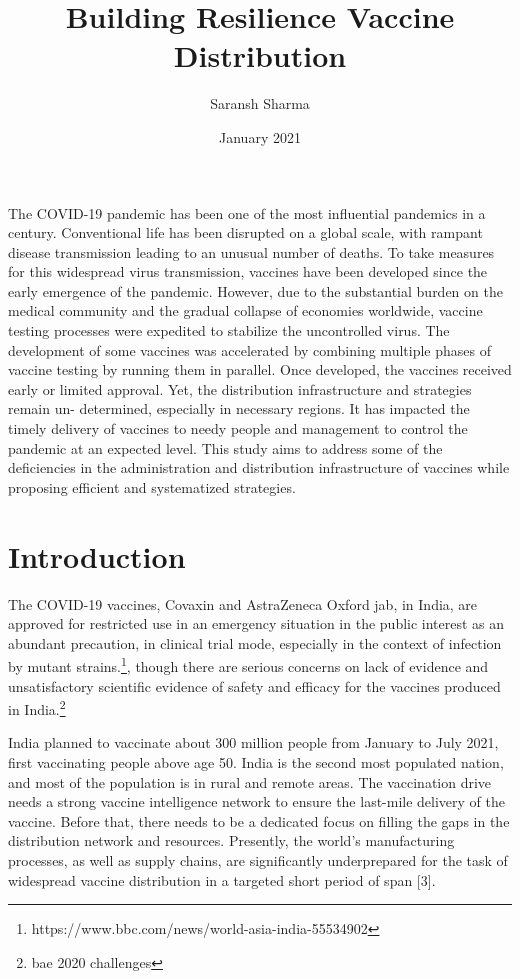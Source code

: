 \documentclass{article}
\begin{document}
\title{Building Resilience Vaccine Distribution}
\author{Saransh Sharma }
\date{January 2021}


\maketitle


\abstract

The COVID-19 pandemic has been one of the most inﬂuential pandemics in a century. Conventional life has been disrupted on a global scale, with rampant disease transmission leading to an unusual number of deaths. To take measures for this widespread virus transmission, vaccines have been developed since the early emergence of the pandemic. However, due to the substantial burden on the medical community and the gradual collapse of economies worldwide, vaccine testing processes were expedited to stabilize the uncontrolled virus. The development of some vaccines was accelerated by combining multiple phases of vaccine testing by running them in parallel. Once developed, the vaccines received early or limited approval. Yet, the distribution infrastructure and strategies remain un- determined, especially in necessary regions. It has impacted the timely delivery of vaccines to needy people and management to control the pandemic at an expected level. This study aims to address some of the deﬁciencies in the administration and distribution infrastructure of vaccines while proposing eﬃcient and systematized strategies.

\section{Introduction}

The COVID-19 vaccines, Covaxin and AstraZeneca Oxford jab, in India, are approved for restricted use in an emergency situation in the public interest as an abundant precaution, in clinical trial mode, especially in the context of infection by mutant strains.\footnote{https://www.bbc.com/news/world-asia-india-55534902}, though there are serious concerns on lack of evidence and unsatisfactory scientific evidence of safety and efficacy for the vaccines produced in India.\footnote{bae 2020 challenges} 

India planned to vaccinate about 300 million people from January to July 2021, first vaccinating people above age 50. India is the second most populated nation, and most of the population is in rural and remote areas. The vaccination drive needs a strong vaccine intelligence network to ensure the last-mile delivery of the vaccine. Before that, there needs to be a dedicated focus on filling the gaps in the distribution network and resources. Presently, the world’s manufacturing processes, as well as supply chains, are significantly underprepared for the task of widespread vaccine distribution in a targeted short period of span [3]. 
\end{document}
